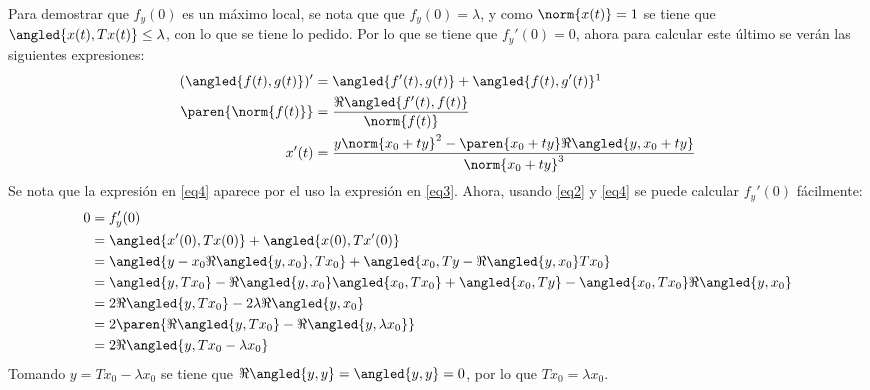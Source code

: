 \documentclass{homework}
\begin{document}
\begin{sol}
    Para demostrar que \(f_y(0)\) es un máximo local, se nota que que \(f_y(0)=\lambda\), y como \(\norm{x(t)}=1\) se tiene que \(\angled{x(t),Tx(t)}\leq\lambda\), con lo que se tiene lo pedido. Por lo que se tiene que \(f_y'(0)=0\), ahora para calcular este último se verán las siguientes expresiones:
    \begin{align}
        (\angled{f(t),g(t)})'&=\angled{f'(t),g(t)}+\angled{f(t),g'(t)}\label{eq2}\footnotemark\\
        \paren{\norm{f(t)}}&=\frac{\Re\angled{f'(t),f(t)}}{\norm{f(t)}}\label{eq3}\\
        x'(t)&=\frac{y\norm{x_0+ty}^2-\paren{x_0+ty}\Re\angled{y,x_0+ty}}{\norm{x_0+ty}^3}\label{eq4}
    \end{align}
    Se nota que la expresión en \eqref{eq4} aparece por el uso la expresión en \eqref{eq3}. Ahora, usando \eqref{eq2} y \eqref{eq4} se puede calcular \(f_y'(0)\) fácilmente:
    \begin{align*}
        0&=f_y'(0)\\
        &=\angled{x'(0),Tx(0)}+\angled{x(0),Tx'(0)}\\
        &=\angled{y-x_0\Re\angled{y,x_0},Tx_0}+\angled{x_0,Ty-\Re\angled{y,x_0}Tx_0}\\
        &=\angled{y,Tx_0}-\Re\angled{y,x_0}\angled{x_0,Tx_0}+\angled{x_0,Ty}-\angled{x_0,Tx_0}\Re\angled{y,x_0}\\
        &=2\Re\angled{y,Tx_0}-2\lambda\Re\angled{y,x_0}\\
        &=2\paren{\Re\angled{y,Tx_0}-\Re\angled{y,\lambda x_0}}\\
        &=2\Re\angled{y,Tx_0-\lambda x_0}
    \end{align*}
    Tomando \(y=Tx_0-\lambda x_0\) se tiene que \(\Re\angled{y,y}=\angled{y,y}=0\), por lo que \(Tx_0=\lambda x_0\).
\end{sol}
\end{document}
